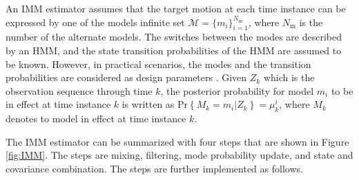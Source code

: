 \documentclass[english, 12pt, a4paper, elec, utf8, a-1b, online]{aaltothesis}
\renewcommand{\Pr}[1]{\text{Pr}\left\{ #1 \right\}}
\newcommand{\modeprob}{\mu_k^i}
\newcommand{\nmodels}{{N_\text{m}}}
\begin{document}
An IMM estimator assumes that the target motion at each time instance can be expressed by one of the models infinite set $\mathcal{M} = \{ m_i \}_{i=1}^\nmodels$, where $\nmodels$ is the number of the alternate models.
The switches between the modes are described by an HMM, and the state transition probabilities of the HMM are assumed to be known.
However, in practical scenarios, the modes and the transition probabilities are considered as design parameters \cite{Simeonova2002}.
Given $Z_k$ which is the observation sequence through time $k$, the posterior probability for model $m_i$ to be in effect at time instance $k$ is written as $\Pr{M_k=m_i | Z_k} = \modeprob$, where $M_k$ denotes to model in effect at time instance $k$.

The IMM estimator can be summarized with four steps that are shown in Figure \ref{fig:IMM}.
The steps are mixing, filtering, mode probability update, and state and covariance combination. 
The steps are further implemented as follows.
\end{document}
